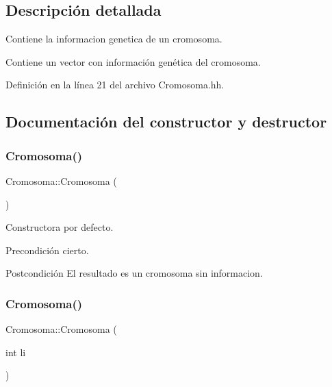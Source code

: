 \subsection{Descripción detallada}
Contiene la informacion genetica de un cromosoma. 

Contiene un vector con información genética del cromosoma. 

Definición en la línea 21 del archivo Cromosoma.\+hh.



\subsection{Documentación del constructor y destructor}
\mbox{\label{class_cromosoma_a8367f3dd60c6af083aed533c69f17b29}} 
\subsubsection{\texorpdfstring{Cromosoma()}{Cromosoma()}\hspace{0.1cm}{\footnotesize\ttfamily [1/2]}}
{\footnotesize\ttfamily Cromosoma\+::\+Cromosoma (\begin{DoxyParamCaption}{ }\end{DoxyParamCaption})}



Constructora por defecto. 

\begin{DoxyPrecond}{Precondición}
cierto. 
\end{DoxyPrecond}
\begin{DoxyPostcond}{Postcondición}
El resultado es un cromosoma sin informacion. 
\end{DoxyPostcond}
\mbox{\label{class_cromosoma_a846b63ce7e4c4db0060336afd62a4d20}} 
\subsubsection{\texorpdfstring{Cromosoma()}{Cromosoma()}\hspace{0.1cm}{\footnotesize\ttfamily [2/2]}}
{\footnotesize\ttfamily Cromosoma\+::\+Cromosoma (\begin{DoxyParamCaption}\item[{int}]{li }\end{DoxyParamCaption})}



